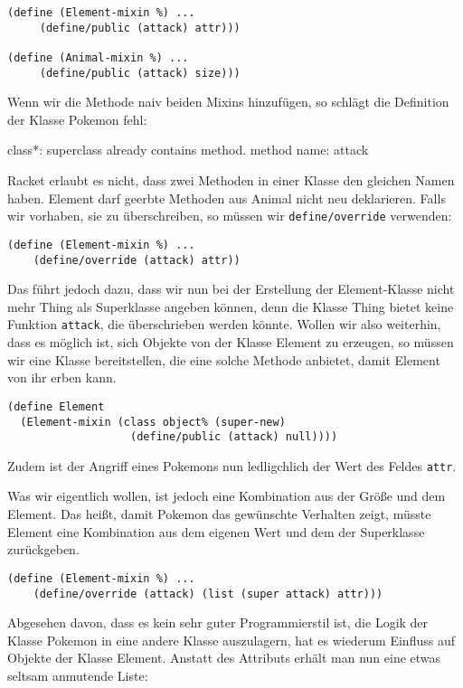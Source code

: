 \begin{lstlisting}
(define (Element-mixin %) ...
     (define/public (attack) attr)))

(define (Animal-mixin %) ...
     (define/public (attack) size)))
\end{lstlisting}

Wenn wir die Methode naiv beiden Mixins hinzufügen, so schlägt die Definition der Klasse Pokemon fehl:

{\rerror class*: superclass already contains method. method name: attack}

Racket erlaubt es nicht, dass zwei Methoden in einer Klasse den gleichen Namen haben. Element darf geerbte Methoden aus Animal nicht neu deklarieren. Falls wir vorhaben, sie zu überschreiben, so müssen wir \texttt{define/override} verwenden:

\begin{lstlisting}
(define (Element-mixin %) ...
    (define/override (attack) attr))
\end{lstlisting}


Das führt jedoch dazu, dass wir nun bei der Erstellung der Element-Klasse nicht mehr Thing als Superklasse angeben können, denn die Klasse Thing bietet keine Funktion \texttt{attack}, die überschrieben werden könnte. Wollen wir also weiterhin, dass es möglich ist, sich Objekte von der Klasse Element zu erzeugen, so müssen wir eine Klasse bereitstellen, die eine solche Methode anbietet, damit Element von ihr erben kann.

\begin{lstlisting}
(define Element 
  (Element-mixin (class object% (super-new)
                   (define/public (attack) null))))
\end{lstlisting}

Zudem ist der Angriff eines Pokemons nun ledligchlich der Wert des Feldes \texttt{attr}. 

Was wir eigentlich wollen, ist jedoch eine Kombination aus der Größe und dem Element. Das heißt, damit Pokemon das gewünschte Verhalten zeigt, müsste Element eine Kombination aus dem eigenen Wert und dem der Superklasse zurückgeben.

\begin{lstlisting}
(define (Element-mixin %) ...
    (define/override (attack) (list (super attack) attr)))
\end{lstlisting}

Abgesehen davon, dass es kein sehr guter Programmierstil ist, die Logik der Klasse Pokemon in eine andere Klasse auszulagern, hat es wiederum Einfluss auf Objekte der Klasse Element. Anstatt des Attributs erhält man nun eine etwas seltsam anmutende Liste:

